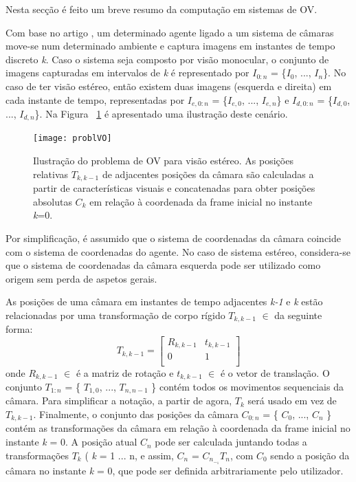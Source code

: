 Nesta secção é feito um breve resumo da computação em sistemas de OV.

Com base no artigo \cite{VOpart1}, um determinado agente ligado a um sistema de câmaras move-se num determinado ambiente e captura imagens em instantes de tempo discreto \textit{k}. Caso o sistema seja composto por visão monocular, o conjunto de imagens capturadas em intervalos de \textit{k} é representado por  \textit{$I_{0:n}$}  = \{\textit{$I_0$}, ..., \textit{$I_n$}\}. 
No caso de ter visão estéreo, então existem duas imagens (esquerda e direita) em cada instante de tempo, representadas por \textit{$I_{e,0:n}$} = \{\textit{$I_{e,0}$}, ..., \textit{$I_{e,n}$}\} e \textit{$I_{d,0:n}$} = \{\textit{$I_{d,0}$}, ..., \textit{$I_{d,n}$}\}. 
Na Figura ~\ref{fig:arch} é apresentado uma ilustração deste cenário. 


\begin{figure}[h!] %
	\begin{center}
		\leavevmode		
		\texttt{[image: problVO]}
		\caption{Ilustração do problema de OV para visão estéreo. As posições relativas $T_{k,k-1}$ de adjacentes posições da câmara são calculadas a partir de características visuais e concatenadas para obter posições absolutas $C_{k}$ em relação à coordenada da frame inicial no instante \textit{k}=0. \cite{VOpart1}}
		\label{fig:arch}
	\end{center}
\end{figure}

Por simplificação, é assumido que o sistema de coordenadas da câmara coincide com o sistema de coordenadas do agente. No caso de sistema estéreo, considera-se que o sistema de coordenadas da câmara esquerda pode ser utilizado como origem sem perda de aspetos gerais.

As posições de uma câmara em instantes de tempo adjacentes \textit{k-1} e \textit{k} estão relacionadas por uma transformação de corpo rígido  $T_{k,k-1}$ $\in$  da seguinte forma: \[ T_{k,k-1} = \left[\begin{array}{cc} R_{k,k-1} & t_{k,k-1} \\  0 & 1 \\ \end{array} \right] \]
onde $R_{k,k-1}$ $\in$  é a matriz de rotação e $t_{k,k-1}$ $\in$  é o vetor de translação. O conjunto $T_{1:n}$ = \{ $T_{1,0}$, ..., $T_{n,n-1}$ \} contém todos os movimentos sequenciais da câmara. Para simplificar
a notação, a partir de agora, $T_k$ será usado em vez de $T_{k,k-1}$. Finalmente, o conjunto das posições da câmara $C_{0:n}$ = \{ $C_0$, ..., $C_n$ \} contém as transformações da câmara em relação à coordenada da frame inicial no instante \textit{k} = 0. A posição atual $C_n$ pode ser calculada juntando todas a transformações $T_k$ ( \textit{k} = 1 ... n\), e assim, $C_n$ = $C_n_-_1T_n$, com $C_0$ sendo a posição da câmara no instante \textit{k} = 0, que pode ser definida arbitrariamente pelo utilizador.

